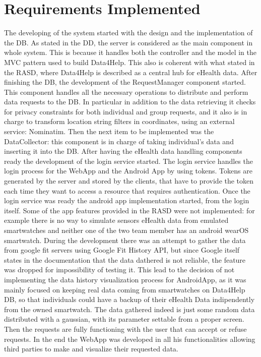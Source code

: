 \section{Requirements Implemented}

The developing of the system started with the design and  the implementation of the DB. As stated in the DD, the server is considered as the main component in whole system. This is because it handles both the controller and the model in the MVC pattern used to build Data4Help.
This also is coherent with what stated in the RASD, where Data4Help is described as a central hub for eHealth data.
After finishing the DB, the development of the RequestManager component started. This component handles all the necessary operations to distribute and perform data requests to the DB. In particular in addition to the data retrieving it checks for privacy constraints for both individual and group requests, and it also is in charge to transform location string filters in coordinates, using an external service: Nominatim.
Then the next item to be implemented was the DataCollector: this component is in charge of taking individual's data and inserting it into the DB.
After having the eHealth data handling components ready the development of the login service started. The login service handles the login process for the WebApp and the Android App by using tokens. Tokens are generated by the server and stored by the clients, that have to provide the token each time they want to access a resource that requires authentication.
Once the login service was ready the android app implementation started, from the login itself. 
Some of the app features provided in the RASD were not implemented: for example there is no way to simulate sensors eHealth data from emulated smartwatches and neither one of the two team member has an android wearOS smartwatch. During the development there was an attempt to gather the data from google fit servers using Google Fit History API, but since Google itself states in the documentation that the data dathered is not reliable, the feature was dropped for impossibility of testing it. This lead to the decision of not implementing the data history visualization process for AndroidApp, as it was mainly focused on keeping real data coming from smartwatches on Data4Help DB, so that individuals could have a backup of their eHealth Data indipendently from the owned smartwatch.
The data gathered indeed is just some random data distributed with a gaussian, with its parameter settable from a proper screen.
Then the requests are fully functioning with the user that can accept or refuse requests.
In the end the WebApp was developed in all his functionalities allowing third parties to make and visualize their requested data.


